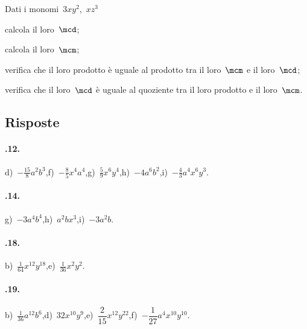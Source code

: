 \begin{esercizio}
 \label{ese:10.50} %
Dati i monomi~$3xy^{2}$,\, $xz^{3}$

\begin{enumeratea}
\item calcola il loro~$\mcd$;
\item calcola il loro~$\mcm$;
\item verifica che il loro prodotto è uguale al prodotto tra il loro~$\mcm$ e il loro~$\mcd$;
\item verifica che il loro~$\mcd$ è uguale al quoziente tra il loro prodotto e il loro~$\mcm$.
\end{enumeratea}
\end{esercizio}

\subsection{Risposte}

\paragraph{\thechapter.12.} d)~$-\frac{15}{8}a^{2}b^{3}$,\quad f)~$-\frac{8}{5}x^{4}a^{4}$,\quad g)~$\frac{5}{9}x^{6}y^{4}$,\quad h)~$-4a^{6}b^{2}$,\quad i)~$-\frac{4}{3}a^{4}x^{6}y^{3}$.
\paragraph{\thechapter.14.} g)~$-3a^{4}b^{4}$,\quad h)~$a^{2}bx^{3}$,\quad i)~$-3a^{2}b$.
\paragraph{\thechapter.18.} b)~$\frac{1}{64}x^{12}y^{18}$,\quad e)~$\frac{1}{36}x^{2}y^{2}$.
\paragraph{\thechapter.19.} b)~$\frac{1}{36}a^{12}b^{6}$,\quad d)~$32x^{10}y^{9}$,\quad e)~$\dfrac{2}{15}x^{12}y^{22}$,\quad f)~$-\dfrac{1}{27}a^{4}x^{10}y^{10}$.
